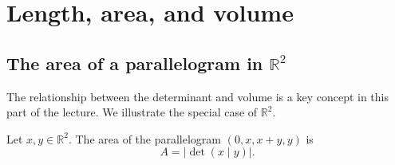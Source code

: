
\section{Length, area, and volume}
\label{sec:length_area_volume}

\subsection{The area of a parallelogram in \texorpdfstring{$\mathbb{R}^2$}{R2}}
\label{sec:area_parallelogram}

The relationship between the determinant and volume is a key concept in this part of the
lecture. We illustrate the special case of $\mathbb{R}^2$.

\begin{proposition}
\label{prop:area_parallelogram_r2}
Let $x,y \in \mathbb{R}^2$. The area of the parallelogram $(0,x,x+y,y)$ is
\[A = \big|\det(x\mid y)\big|.\]
\end{proposition}

